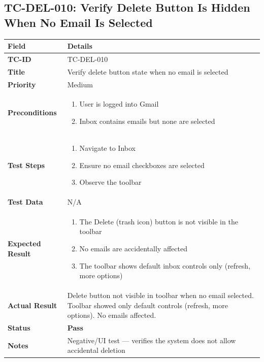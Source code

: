 \documentclass[12pt,a4paper]{article}
\begin{document}
\subsection{TC-DEL-010: Verify Delete Button Is Hidden When No Email Is Selected}

\begin{longtable}{|L{3.5cm}|L{11.5cm}|}
\hline
{}\textbf{Field} & \textbf{Details} \\
\hline
\textbf{TC-ID}           & TC-DEL-010 \\
\hline
\textbf{Title}           & Verify delete button state when no email is selected \\
\hline
\textbf{Priority}        & Medium \\
\hline
\textbf{Preconditions}   & \begin{enumerate}[noitemsep,topsep=0pt]
                              \item User is logged into Gmail
                              \item Inbox contains emails but none are selected
                            \end{enumerate} \\
\hline
\textbf{Test Steps}      & \begin{enumerate}[noitemsep,topsep=0pt]
                              \item Navigate to Inbox
                              \item Ensure no email checkboxes are selected
                              \item Observe the toolbar
                            \end{enumerate} \\
\hline
\textbf{Test Data}       & N/A \\
\hline
\textbf{Expected Result} & \begin{enumerate}[noitemsep,topsep=0pt]
                              \item The Delete (trash icon) button is not visible in the toolbar
                              \item No emails are accidentally affected
                              \item The toolbar shows default inbox controls only (refresh, more options)
                            \end{enumerate} \\
\hline
\textbf{Actual Result}   & Delete button not visible in toolbar when no email selected. Toolbar showed only default controls (refresh, more options). No emails affected. \\
\hline
\textbf{Status}          & \textcolor{passgreen}{\textbf{Pass}} \\
\hline
\textbf{Notes}           & Negative/UI test — verifies the system does not allow accidental deletion \\
\hline
\end{longtable}
\end{document}
